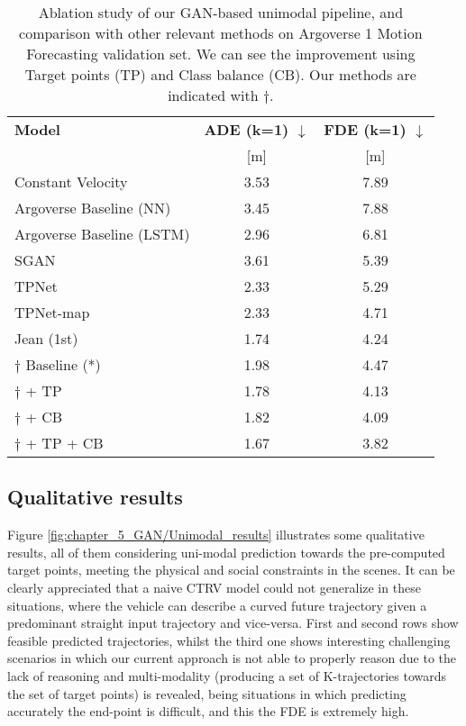 \begin{table}[!h]
	\caption[Ablation study of our GAN-based unimodal pipeline, and comparison with other relevant methods on Argoverse 1 Motion Forecasting validation set]{Ablation study of our GAN-based unimodal pipeline, and comparison with other relevant methods on Argoverse 1 Motion Forecasting validation set. We can see the improvement using Target points (TP) and Class balance (CB). Our methods are indicated with $\dag$.}
	\begin{center}
		\begin{tabular}{| l | c | c |}
			\toprule
			\textbf{Model} & \textbf{ADE (k=1) $\downarrow$} & \textbf{FDE (k=1) $\downarrow$} \\
			& [m] & [m] \\
			\midrule
			Constant Velocity \cite{chang2019argoverse} & 3.53 & 7.89 \\ 
			Argoverse Baseline (NN) \cite{chang2019argoverse} & 3.45  & 7.88 \\ 
			Argoverse Baseline (LSTM) \cite{chang2019argoverse} & 2.96  & 6.81 \\ 
			SGAN \cite{gupta2018social} & 3.61  & 5.39 \\ 
			TPNet \cite{fang2020tpnet} & 2.33  & 5.29 \\ 
			TPNet-map \cite{fang2020tpnet} & 2.33  & 4.71 \\ 
			Jean (1st) \cite{chang2019argoverse, mercat2020multi} & 1.74  & 4.24 \\ 
			\midrule 
			$\dag$ Baseline (*) & 1.98  & 4.47 \\ 
			$\dag$ + TP & 1.78  & 4.13 \\
			$\dag$ + CB & 1.82  & 4.09 \\
			$\dag$ + TP + CB & 1.67  & 3.82 \\
			\hline
		\end{tabular}
		\label{table:5_model_results_test}
	\end{center}
\end{table}

\subsection{Qualitative results}
\label{subsec:5_qualitative_results}

Figure \ref{fig:chapter_5_GAN/Unimodal_results} illustrates some qualitative results, all of them considering uni-modal prediction towards the pre-computed target points, meeting the physical and social constraints in the scenes. It can be clearly appreciated that a naive \ac{CTRV} model could not generalize in these situations, where the vehicle can describe a curved future trajectory given a predominant straight input trajectory and vice-versa. First and second rows show feasible predicted trajectories, whilst the third one shows interesting challenging scenarios in which our current approach is not able to properly reason due to the lack of reasoning and multi-modality (producing a set of K-trajectories towards the set of target points) is revealed, being situations in which predicting accurately the end-point is difficult, and this the \ac{FDE} is extremely high. 

